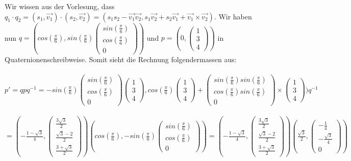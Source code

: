 \documentclass{article} %
\begin{document}
Wir wissen aus der Vorlesung, dass $q_1 \cdot q_2 = (s_1, \vec{v_1}) \cdot (s_2, \vec{v_2}) = (s_1 s_2 - \vec{v_1} \vec{v_2}, s_1 \vec{v_2} + s_2 \vec{v_1} + \vec{v_1} \times \vec{v_2})$. Wir haben nun $q = (cos(\frac{\pi}{6}), sin(\frac{\pi}{6})\begin{pmatrix}
sin(\frac{\pi}{6})\\
cos(\frac{\pi}{6})\\
0
\end{pmatrix})$ und $p = (0, \begin{pmatrix}
1\\
3\\
4
\end{pmatrix})$ in Quaternionenschreibweise. Somit sieht die Rechnung folgendermassen aus: \\\\
$p' = qpq^{-1} = -sin(\frac{\pi}{6})\begin{pmatrix}
sin(\frac{\pi}{6})\\
cos(\frac{\pi}{6})\\
0
\end{pmatrix} \begin{pmatrix}
1\\
3\\
4
\end{pmatrix}, cos(\frac{\pi}{6}) \begin{pmatrix}
1\\
3\\
4
\end{pmatrix} + \begin{pmatrix}
sin(\frac{\pi}{6})sin(\frac{\pi}{6})\\
cos(\frac{\pi}{6})sin(\frac{\pi}{6})\\
0
\end{pmatrix} \times \begin{pmatrix}
1\\
3\\
4
\end{pmatrix})q^{-1}$ \\\\

$= (- \frac{1-\sqrt{3}}{4}, \begin{pmatrix}
\frac{3\sqrt{3}}{2}\\
\frac{\sqrt{3} - 2}{2}\\
\frac{3 + \sqrt{3}}{2}
\end{pmatrix})(cos(\frac{\pi}{6}), - sin(\frac{\pi}{6})\begin{pmatrix}
sin(\frac{\pi}{6})\\
cos(\frac{\pi}{6})\\
0
\end{pmatrix}) = (- \frac{1-\sqrt{3}}{4}, \begin{pmatrix}
\frac{3\sqrt{3}}{2}\\
\frac{\sqrt{3} - 2}{2}\\
\frac{3 + \sqrt{3}}{2}
\end{pmatrix}) (\frac{\sqrt{3}}{2}, \begin{pmatrix}
- \frac{1}{4} \\
- \frac{\sqrt{3}}{4} \\
0
\end{pmatrix})$ \\\\
\end{document}
